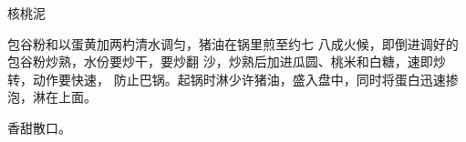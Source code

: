 \begin{recipe}{核桃泥}

\ingredients




\cooking

包谷粉和以蛋黄加两杓清水调匀，猪油在锅里煎至约七 八成火候，即倒进调好的包谷粉炒熟，水份要炒干，要炒翻 沙，炒熟后加进瓜圆、桃米和白糖，速即炒转，动作要快速， 防止巴锅。起锅时淋少许猪油，盛入盘中，同时将蛋白迅速掺 泡，淋在上面。

\notes

香甜散口。

\end{recipe}

